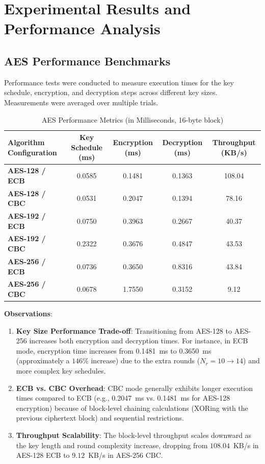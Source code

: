 \documentclass[11pt,a4paper]{article}
\begin{document}
\section{Experimental Results and Performance Analysis}

\subsection{AES Performance Benchmarks}
Performance tests were conducted to measure execution times for the key schedule, encryption, and decryption steps across different key sizes. Measurements were averaged over multiple trials.

\begin{table}[H]
    \centering
    \caption{AES Performance Metrics (in Milliseconds, 16-byte block)}
    \begin{tabularx}{\textwidth}{L C C C C}
        \toprule
        \textbf{Algorithm Configuration} & \textbf{Key Schedule (ms)} & \textbf{Encryption (ms)} & \textbf{Decryption (ms)} & \textbf{Throughput (KB/s)} \\
        \midrule
        \textbf{AES-128 / ECB} & 0.0585 & 0.1481 & 0.1363 & 108.04 \\
        \textbf{AES-128 / CBC} & 0.0531 & 0.2047 & 0.1394 & 78.16 \\
        \textbf{AES-192 / ECB} & 0.0750 & 0.3963 & 0.2667 & 40.37 \\
        \textbf{AES-192 / CBC} & 0.2322 & 0.3676 & 0.4847 & 43.53 \\
        \textbf{AES-256 / ECB} & 0.0736 & 0.3650 & 0.8316 & 43.84 \\
        \textbf{AES-256 / CBC} & 0.0678 & 1.7550 & 0.3152 & 9.12 \\
        \bottomrule
    \end{tabularx}
\end{table}

\textbf{Observations}:
\begin{enumerate}
    \item \textbf{Key Size Performance Trade-off}: Transitioning from AES-128 to AES-256 increases both encryption and decryption times. For instance, in ECB mode, encryption time increases from 0.1481~ms to 0.3650~ms (approximately a $146\%$ increase) due to the extra rounds ($N_r = 10 \rightarrow 14$) and more complex key schedules.
    \item \textbf{ECB vs. CBC Overhead}: CBC mode generally exhibits longer execution times compared to ECB (e.g., 0.2047~ms vs. 0.1481~ms for AES-128 encryption) because of block-level chaining calculations (XORing with the previous ciphertext block) and sequential restrictions.
    \item \textbf{Throughput Scalability}: The block-level throughput scales downward as the key length and round complexity increase, dropping from $108.04$~KB/s in AES-128 ECB to $9.12$~KB/s in AES-256 CBC.
\end{enumerate}
\end{document}
